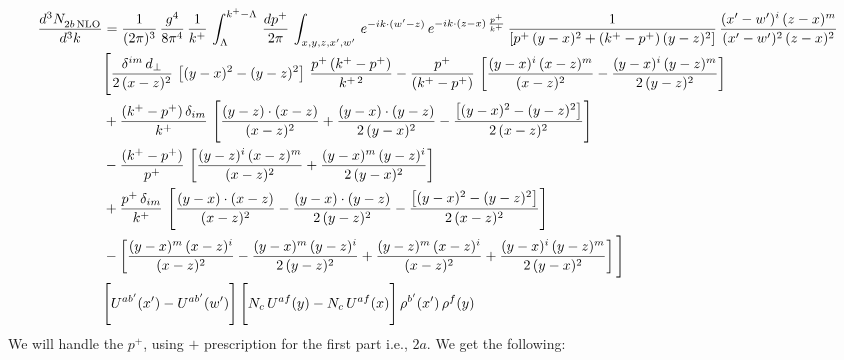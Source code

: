 \documentclass[9pt]{article}
\numberwithin{equation}{section}
\begin{document}
\begin{align}
 \frac{d^{3}N_{2b\,\rm NLO}^{\rm}}{d^{3}k}  & =   \frac{1}{(2\pi)^{3}}\,\frac{g^{4}}{8\pi^{4}}\,\frac{1}{k^{+}}\,\int_{\Lambda}^{k^{+}-\Lambda}\, \frac{dp^{+}}{2\pi} \, \int_{x,y,z,x',w'}\,e^{-ik\cdot(w'-z)}\,e^{-ik\cdot (z-x)\,\frac{p^{+}}{k^{+}}}\,\frac{1}{\left[p^{+}\,(y-x)^{2}+(k^{+}-p^{+})\,(y-z)^{2}\right]}\, \frac{(x'-w')^{i}\,(z-x)^{m}}{(x'-w')^{2}\,(z-x)^{2}} \notag \\ & \Bigg[\frac{\delta^{im}\,d_{\perp}}{2\,(x-z)^{2}}\,\left[(y-x)^{2}-(y-z)^{2}\right]\,\frac{p^{+}\,(k^{+}-p^{+})}{k^{+\,2}}-\frac{p^{+}}{(k^{+}-p^{+})}\,\left[\frac{(y-x)^{i}\,(x-z)^{m}}{(x-z)^{2}}-\frac{(y-x)^{i}\,(y-z)^{m}}{2\,(y-z)^{2}}\right]\notag \\ & +\frac{(k^{+}-p^{+})\,\delta_{im}}{k^{+}}\,\left[\frac{(y-z)\cdot (x-z)}{(x-z)^{2}}+\frac{(y-x)\cdot (y-z)}{2\,(y-x)^{2}}-\frac{\left[(y-x)^{2}-(y-z)^{2}\right]}{2\,(x-z)^{2}}\right]\notag \\ & -\frac{(k^{+}-p^{+})}{p^{+}}\,\left[\frac{(y-z)^{i}\,(x-z)^{m}}{(x-z)^{2}}+\frac{(y-x)^{m}\,(y-z)^{i}}{2\,(y-x)^{2}}\right]\notag \\ & +\frac{p^{+}\,\delta_{im}}{k^{+}}\,\left[\frac{(y-x)\cdot (x-z)}{(x-z)^{2}}-\frac{(y-x)\cdot (y-z)}{2\,(y-z)^{2}}-\frac{\left[(y-x)^{2}-(y-z)^{2}\right]}{2\,(x-z)^{2}}\right]\notag \\ &-\left[\frac{(y-x)^{m}\,(x-z)^{i}}{(x-z)^{2}}-\frac{(y-x)^{m}\,(y-z)^{i}}{2\,(y-z)^{2}}+\frac{(y-z)^{m}\,(x-z)^{i}}{(x-z)^{2}}+\frac{(y-x)^{i}\,(y-z)^{m}}{2\,(y-x)^{2}}\right]\Bigg] \notag \\ & \Bigg[U^{ab'}(x')-U^{ab'}(w')\Bigg]\,\Bigg[N_{c}\,U^{af}(y) -N_{c}\,U^{af}(x)\Bigg]\,\rho^{b'}(x')\,\rho^{f}(y)
\end{align}
We will handle the $p^{+}$, using $+$ prescription for the first part i.e., $2a$. We get the following: 
\end{document}
